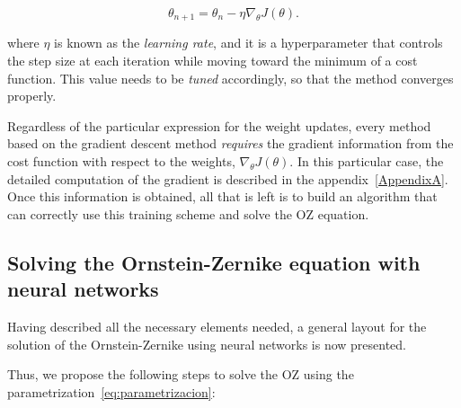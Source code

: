\begin{equation}
    \theta_{n+1} = \theta_n - \eta \nabla_{\theta} J(\theta) .
    \label{eq:gradiente}
\end{equation}

where $\eta$ is known as the \emph{learning rate}, and it is a hyperparameter
that controls the step size at each iteration while moving toward the minimum
of a cost function. This value needs to be \emph{tuned} accordingly, so
that the method converges properly.

Regardless of the particular expression for the weight updates, every method
based on the gradient descent method \emph{requires} the gradient information from
the cost function with respect to the weights, $\nabla_{\theta} J(\theta)$.
In this particular case, the detailed computation of the gradient is described in
the appendix~\ref{AppendixA}.
Once this information is obtained, all that is left is to build an algorithm that
can correctly use this training scheme and solve the OZ equation.

\subsection{Solving the Ornstein-Zernike equation with neural networks}
Having described all the necessary elements needed, a general layout for the solution
of the Ornstein-Zernike using neural networks is now presented.

Thus, we propose the following steps to solve the OZ using the parametrization~\eqref{eq:parametrizacion}:

